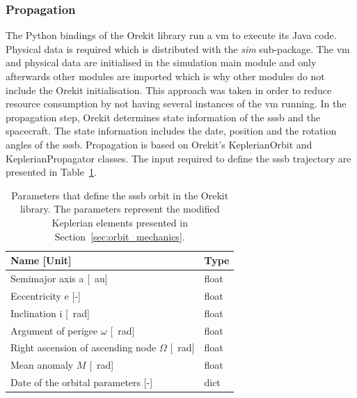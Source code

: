 
\subsubsection{Propagation}
The Python bindings of the Orekit library run a \gls{vm} to execute its Java code. Physical data is required which is distributed with the \textit{sim} sub-package. The \gls{vm} and physical data are initialised in the simulation main module and only afterwards other modules are imported which is why other modules do not include the Orekit initialisation. This approach was taken in order to reduce resource consumption by not having several instances of the \gls{vm} running. In the propagation step, Orekit determines state information of the \gls{sssb} and the spacecraft. The state information includes the date, position and the rotation angles of the \gls{sssb}. Propagation is based on Orekit's KeplerianOrbit and KeplerianPropagator classes. The input required to define the \gls{sssb} trajectory are presented in Table~\ref{tab:keplerorbit_params}.

\begin{table}[htb]
    \centering
    \caption{Parameters that define the \gls{sssb} orbit in the Orekit library. The parameters represent the modified Keplerian elements presented in Section~\ref{sec:orbit_mechanics}.}
    \label{tab:keplerorbit_params}
    \begin{tabular}{p{}|p{}}
        \textbf{Name [Unit]} & \textbf{Type} \\ \hline
        Semi\-major axis a [\SI{}{\astronomicalunit}] & float\\
        Eccentricity e [-] & float\\
        Inclination i [\SI{}{\radian}] & float \\
        Argument of perigee  $\omega$ [\SI{}{\radian}] & float \\
        Right ascension of ascending node $\Omega$ [\SI{}{\radian}] & float \\
        Mean anomaly $M$ [\SI{}{\radian}] & float \\
        Date of the orbital parameters [-] & dict\footnotemark
    \end{tabular}
\end{table}

